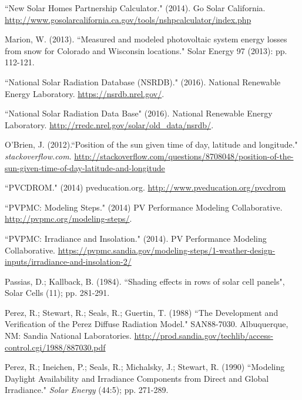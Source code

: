 \documentclass[12pt,letterpaper]{article}
\begin{document}
\begin{thebibliography}{99}
 ``New Solar Homes Partnership Calculator." (2014). Go Solar California. \url{http://www.gosolarcalifornia.ca.gov/tools/nshpcalculator/index.php}

 Marion, W. (2013). ``Measured and modeled photovoltaic system energy losses from snow for Colorado and Wisconsin locations." Solar Energy 97 (2013): pp. 112-121.

 ``National Solar Radiation Database (NSRDB)." (2016). National Renewable Energy Laboratory.  \url{https://nsrdb.nrel.gov/}.

 ``National Solar Radiation Data Base" (2016). National Renewable Energy Laboratory. \url{http://rredc.nrel.gov/solar/old_data/nsrdb/}.

 O'Brien, J. (2012).``Position of the sun given time of day, latitude and longitude." \textit{stackoverflow.com}. \url{http://stackoverflow.com/questions/8708048/position-of-the-sun-given-time-of-day-latitude-and-longitude}

 ``PVCDROM." (2014) pveducation.org. \url{http://www.pveducation.org/pvcdrom}

``PVPMC: Modeling Steps." (2014) PV Performance Modeling Collaborative. \url{http://pvpmc.org/modeling-steps/}.

 ``PVPMC: Irradiance and Insolation." (2014). PV Performance Modeling Collaborative. \url{https://pvpmc.sandia.gov/modeling-steps/1-weather-design-inputs/irradiance-and-insolation-2/}

 Passias, D.; Kallback, B.  (1984). ``Shading effects in rows of solar cell panels", Solar Cells (11); pp. 281-291.

 Perez, R.; Stewart, R.; Seals, R.; Guertin, T. (1988) ``The Development and Verification of the Perez Diffuse Radiation Model." SAN88-7030. Albuquerque, NM: Sandia National Laboratories. \url{http://prod.sandia.gov/techlib/access-control.cgi/1988/887030.pdf}

 Perez, R.; Ineichen, P.; Seals, R.; Michalsky, J.; Stewart, R. (1990) ``Modeling Daylight Availability and Irradiance Components from Direct and Global Irradiance." \textit{Solar Energy} (44:5); pp. 271-289.


\end{thebibliography}
\end{document}
